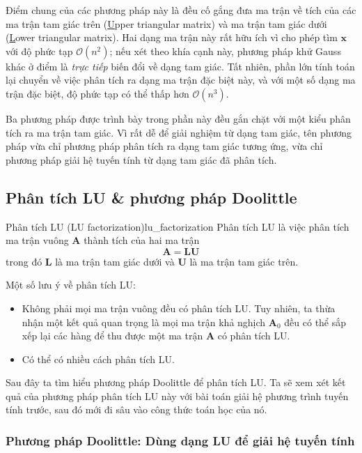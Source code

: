 \documentclass[../../Lectures]{subfiles}
\begin{document}
Điểm chung của các phương pháp này là đều cố gắng đưa ma trận về tích của các ma
trận tam giác trên (\underline{U}pper triangular matrix) và ma trận tam giác
dưới (\underline{L}ower triangular matrix). Hai dạng ma trận này rất hữu ích vì
cho phép tìm \(\bm{x}\) với độ phức tạp \(\mathcal{O} (n^2)\); nếu xét theo khía
cạnh này, phương pháp khử Gauss khác ở điểm là \emph{trực tiếp} biến đổi về dạng
tam giác. Tất nhiên, phần lớn tính toán lại chuyển về việc phân tích ra dạng ma
trận đặc biệt này, và với một số dạng ma trận đặc biệt, độ phức tạp có thể thấp
hơn \(\mathcal{O} (n^3)\).

Ba phương pháp được trình bày trong phần này đều gắn chặt với một kiểu phân tích
ra ma trận tam giác. Vì rất dễ để giải nghiệm từ dạng tam giác, tên phương pháp
vừa chỉ phương pháp phân tích ra dạng tam giác tương ứng, vừa chỉ phương pháp
giải hệ tuyến tính từ dạng tam giác đã phân tích.

\subsection{Phân tích LU \& phương pháp Doolittle}

\begin{cdefinition}{Phân tích LU (LU factorization)}{lu_factorization}
    Phân tích LU là việc phân tích ma trận vuông \(\bm{A}\) thành tích của hai
    ma trận
    \[\bm{A} = \bm{LU}\] trong đó \(\bm{L}\) là ma trận tam giác dưới và
    \(\bm{U}\) là ma trận tam giác trên.
\end{cdefinition}

Một số lưu ý về phân tích LU:
\begin{itemize}
    \item Không phải mọi ma trận vuông đều có phân tích LU. Tuy nhiên, ta thừa
        nhận một kết quả quan trọng là mọi ma trận khả nghịch \(\bm{A}_0\) đều
        có thể sắp xếp lại các hàng để thu được một ma trận \(\bm{A}\) có phân
        tích LU.

    \item Có thể có nhiều cách phân tích LU.
\end{itemize}

Sau đây ta tìm hiểu phương pháp Doolittle để phân tích LU. Ta sẽ xem xét kết quả
của phương pháp phân tích LU này với bài toán giải hệ phương trình tuyến tính
trước, sau đó mới đi sâu vào công thức toán học của nó.

\subsubsection{Phương pháp Doolittle: Dùng dạng LU để giải hệ tuyến tính}
\end{document}

